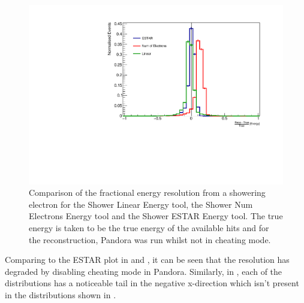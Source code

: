 \begin{figure}[h!]
    \centering
    \includegraphics[width = \largefigwidth]{figures-chap4/non_cheat/ESTAR_plane2_frac_res.pdf}
    \caption[Fractional resolution of the shower energy with Pandora being run not in cheating mode.]{Comparison of the fractional energy resolution from a showering electron for the Shower Linear Energy tool, the Shower Num Electrons Energy tool and the Shower ESTAR Energy tool. The true energy is taken to be the true energy of the available hits and for the reconstruction, Pandora was run whilst not in cheating mode.}
    \label{fig:frac_res_no_cheat}
\end{figure}

Comparing  to the ESTAR plot in  and , it can be seen that the resolution has degraded by disabling cheating mode in Pandora. Similarly, in , each of the distributions has a noticeable tail in the negative x-direction which isn't present in the distributions shown in .

%
